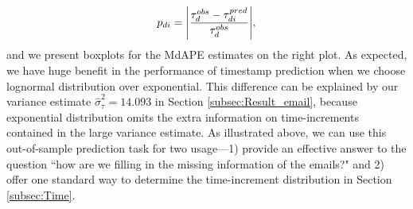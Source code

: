 \documentclass[12pt]{article}
\DeclarePairedDelimiter\abs{\lvert}{\rvert}
\begin{document}
	\begin{equation*}
	p_{di} = \abs*{\frac{\tau^{obs}_d - \tau^{pred}_{di}}{\tau^{obs}_d}},
	\end{equation*}
	and we present boxplots for the MdAPE estimates on the right plot. As expected, we have huge benefit in the performance of timestamp prediction when we choose lognormal distribution over exponential. This difference can be explained by our variance estimate $\hat{\sigma}_\tau^2= 14.093$ in Section \ref{subsec:Result_email}, because exponential distribution omits the extra information on time-increments contained in the large variance estimate. As illustrated above, we can use this out-of-sample prediction task for two usage---1) provide an effective answer to the question ``how are we filling in the missing information of the emails?" and 2) offer one standard way to determine the time-increment distribution in Section \ref{subsec:Time}. 
\end{document}
